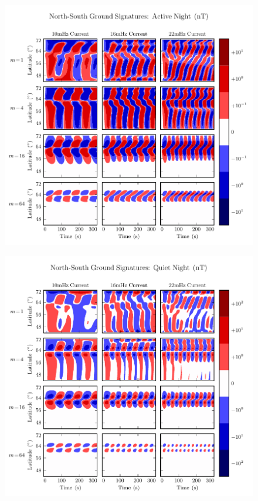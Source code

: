 \begin{figure}[H]
    \centering
    \includegraphics[width=\textwidth]{figures/BqE_J_3.pdf}
    \caption[North-South Ground Signatures: Active Night]{}
    \label{fig_BqE_J_3}
\end{figure}

\begin{figure}[H]
    \centering
    \includegraphics[width=\textwidth]{figures/BqE_J_4.pdf}
    \caption[North-South Ground Signatures: Quiet Night]{}
    \label{fig_BqE_J_4}
\end{figure}


